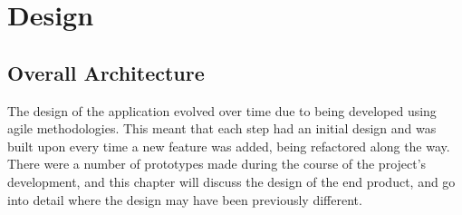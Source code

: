 \chapter{Design}




 


\section{Overall Architecture}
The design of the application evolved over time due to being developed using agile methodologies. This meant that each step had an initial design and was built upon every time a new feature was added, being refactored along the way. There were a number of prototypes made during the course of the project's development, and this chapter will discuss the design of the end product, and go into detail where the design may have been previously different.

